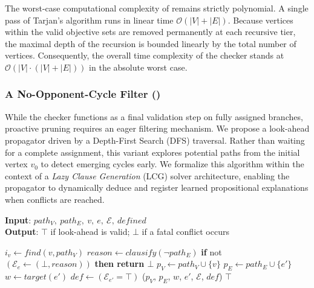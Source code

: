 \documentclass[a4paper,fleqn]{cas-sc}
\begin{document}
The worst-case computational complexity of \nocchecker remains strictly polynomial. A single pass of Tarjan’s algorithm runs in linear time $\mathcal{O}(|V| + |E|)$. Because vertices within the valid objective sets are removed permanently at each recursive tier, the maximal depth of the recursion is bounded linearly by the total number of vertices. Consequently, the overall time complexity of the checker stands at $\mathcal{O}(|V| \cdot (|V| + |E|))$ in the absolute worst case.

\subsubsection{A No-Opponent-Cycle Filter (\noceager)} \label{sec:nocfilter}

While the checker functions as a final validation step on fully assigned branches, proactive pruning requires an eager filtering mechanism. We propose a look-ahead propagator driven by a Depth-First Search (DFS) traversal. Rather than waiting for a complete assignment, this variant explores potential paths from the initial vertex $v_0$ to detect emerging cycles early. We formalize this algorithm within the context of a \textit{Lazy Clause Generation} (LCG) solver architecture, enabling the propagator to dynamically deduce and register learned propositional explanations when conflicts are reached.

\begin{algorithm}[htb]
\small
\caption{\textbf{\noceager}}
\textbf{Input}: $path_V,\ path_E,\ v,\ e,\ \mathcal{E},\ \textit{defined}$ \\
\textbf{Output}: $\top$ if look-ahead is valid; $\bot$ if a fatal conflict occurs
\begin{algorithmic}[1]
     \label{alg:noceager:pathcheck}
        \STATE $i_v \gets \textit{find}(v, path_V)$ \label{alg:noceager:findcycle}
         \label{alg:noceager:checkopponent}
            \STATE $\textit{reason} \gets \textit{clausify}(\neg path_E)$ \label{alg:noceager:reason}
            \STATE \textbf{if } not $(\mathcal{E}_e \gets (\bot, \textit{reason}))$ \textbf{then return $\bot$}
        \ENDIF
     \label{alg:noceager:defcheck}
         \label{alg:no-opponent-cycle-f1:edgecheck}
            \STATE $p_V \gets path_V \cup \{v\}$
            \STATE $p_E \gets path_E \cup \{e'\}$
            \STATE $w \gets \textit{target}(e')$
            \STATE $\textit{def} \gets (\mathcal{E}_{e'} = \top)$
            \STATE \noceager($p_V$, $p_E$, $w$, $e'$, $\mathcal{E}$, $\textit{def}$)
        \ENDFOR
    \ENDIF
    \RETURN $\top$
\end{algorithmic}
\label{alg:noceager}
\end{algorithm}
\end{document}
